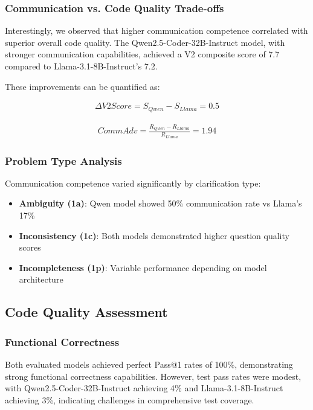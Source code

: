 \documentclass[conference]{IEEEtran}
\begin{document}
\subsubsection{Communication vs. Code Quality Trade-offs}

Interestingly, we observed that higher communication competence correlated with superior overall code quality. The Qwen2.5-Coder-32B-Instruct model, with stronger communication capabilities, achieved a V2 composite score of 7.7 compared to Llama-3.1-8B-Instruct's 7.2.

These improvements can be quantified as:

\begin{align}
\Delta \mathit{V2Score} = S_{Qwen} - S_{Llama} = 0.5
\end{align}

\begin{align}
    \mathit{CommAdv} = \frac{R_{Qwen} - R_{Llama}}{R_{Llama}} = 1.94
\end{align}

\subsubsection{Problem Type Analysis}

Communication competence varied significantly by clarification type:

\begin{itemize}
    \item \textbf{Ambiguity (1a)}: Qwen model showed 50\% communication rate vs Llama's 17\%
    \item \textbf{Inconsistency (1c)}: Both models demonstrated higher question quality scores
    \item \textbf{Incompleteness (1p)}: Variable performance depending on model architecture
\end{itemize}

\subsection{Code Quality Assessment}

\subsubsection{Functional Correctness}

Both evaluated models achieved perfect Pass@1 rates of 100\%, demonstrating strong functional correctness capabilities. However, test pass rates were modest, with Qwen2.5-Coder-32B-Instruct achieving 4\% and Llama-3.1-8B-Instruct achieving 3\%, indicating challenges in comprehensive test coverage.
\end{document}
